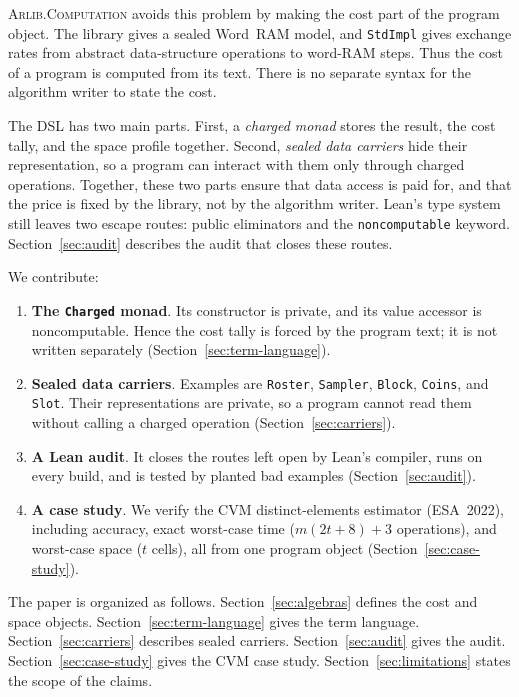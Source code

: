 \documentclass[acmsmall,nonacm]{acmart}
\begin{document}
\textsc{Arlib.Computation} avoids this problem by making the cost part of the program object.
The library gives a sealed Word~RAM model, and \lstinline{StdImpl} gives exchange rates from abstract data-structure operations to word-RAM steps.
Thus the cost of a program is computed from its text.
There is no separate syntax for the algorithm writer to state the cost.

The DSL has two main parts.
First, a \emph{charged monad} stores the result, the cost tally, and the space profile together.
Second, \emph{sealed data carriers} hide their representation, so a program can interact with them only through charged operations.
Together, these two parts ensure that data access is paid for, and that the price is fixed by the library, not by the algorithm writer.
Lean's type system still leaves two escape routes: public eliminators and the \lstinline{noncomputable} keyword.
Section~\ref{sec:audit} describes the audit that closes these routes.

We contribute:
\begin{enumerate}
  \item \textbf{The \lstinline{Charged} monad}. Its constructor is private, and its value accessor is noncomputable. Hence the cost tally is forced by the program text; it is not written separately (Section~\ref{sec:term-language}).
  \item \textbf{Sealed data carriers}. Examples are \lstinline{Roster}, \lstinline{Sampler}, \lstinline{Block}, \lstinline{Coins}, and \lstinline{Slot}. Their representations are private, so a program cannot read them without calling a charged operation (Section~\ref{sec:carriers}).
  \item \textbf{A Lean audit}. It closes the routes left open by Lean's compiler, runs on every build, and is tested by planted bad examples (Section~\ref{sec:audit}).
  \item \textbf{A case study}. We verify the CVM distinct-elements estimator (ESA~2022), including accuracy, exact worst-case time ($m(2t + 8) + 3$ operations), and worst-case space ($t$ cells), all from one program object (Section~\ref{sec:case-study}).
\end{enumerate}

The paper is organized as follows.
Section~\ref{sec:algebras} defines the cost and space objects.
Section~\ref{sec:term-language} gives the term language.
Section~\ref{sec:carriers} describes sealed carriers.
Section~\ref{sec:audit} gives the audit.
Section~\ref{sec:case-study} gives the CVM case study.
Section~\ref{sec:limitations} states the scope of the claims.
\end{document}
